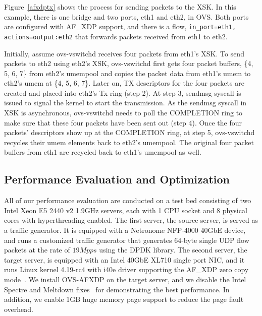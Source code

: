 \documentclass[10pt,numbers,reprint]{sigplanconf}
\begin{document}
Figure~\ref{afxdptx} shows the process for sending packets to the XSK.
In this example, there is one bridge and two ports, eth1 and eth2, in OVS.
Both ports are configured with AF\_XDP support, and there is a flow,
\texttt{in\_port=eth1, actions=output:eth2} that forwards
packets received from eth1 to eth2.

Initially, assume ovs-vswitchd receives four packets from eth1's XSK.
To send packets to eth2 using eth2's XSK, ovs-vswitchd first gets four packet buffers,
\{4, 5, 6, 7\} from eth2's umempool and copies the packet data from eth1's umem
to eth2's umem at \{4, 5, 6, 7\}.  Later on, TX descriptors for the four packets are
created and placed into eth2's Tx ring (step 2).
At step 3, sendmsg syscall is issued to signal the kernel to start the transmission.
As the sendmsg syscall in XSK is asynchronous, ovs-vswitchd needs to poll
the COMPLETION ring to make sure that these four packets have been sent out
(step 4).
Once the four packets' descriptors show up at the COMPLETION ring, at step 5,
ovs-vswitchd recycles their umem elements back to eth2's umempool.
The original four packet buffers from eth1 are recycled back to eth1's
umempool as well.

\subsection{Performance Evaluation and Optimization}
All of our performance evaluation are conducted on a test bed consisting of
two Intel Xeon E5 2440 v2 1.9GHz servers, each with 1 CPU socket and
8 physical cores with hyperthreading enabled.
The first server, the source server, is served as a traffic generator.
It is equipped with a Netronome NFP-4000 40GbE device, and runs a customized
traffic generator that generates 64-byte single UDP flow packets
at the rate of $19Mpps$ using the DPDK library.
The second server, the target server, is equipped with an Intel 40GbE XL710
single port NIC, and it runs Linux kernel 4.19-rc4 with i40e driver supporting
the AF\_XDP zero copy mode~\cite{af_xdp_patch_i40e, af_xdp_patch_zc}.
We install OVS-AFXDP on the target server, and
we disable the Intel Spectre and Meltdown fixes~\cite{jesper_xdp_perf_drop, retpoline}
for demonstrating the best performance. In addition, we enable 1GB huge
memory page support to reduce the page fault overhead.
\end{document}
